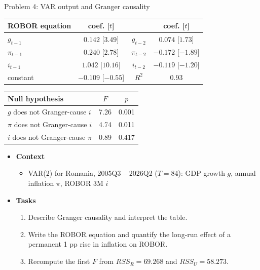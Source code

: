 \begin{frame}{Problem 4: VAR output and Granger causality}
\itemsize{\footnotesize}
\begin{center}
\scriptsize
\begin{tabular}{lccc}
\toprule
\textbf{ROBOR equation} & coef. [$t$] & & coef. [$t$] \\
\midrule
$g_{t-1}$ & $0.142$ [$3.49$] & $g_{t-2}$ & $0.074$ [$1.73$] \\
$\pi_{t-1}$ & $0.240$ [$2.78$] & $\pi_{t-2}$ & $\ensuremath{-}0.172$ [$\ensuremath{-}1.89$] \\
$i_{t-1}$ & $1.042$ [$10.16$] & $i_{t-2}$ & $\ensuremath{-}0.119$ [$\ensuremath{-}1.20$] \\
constant & $\ensuremath{-}0.109$ [$\ensuremath{-}0.55$] & $R^2$ & 0.93 \\
\bottomrule
\end{tabular}
\end{center}
\begin{center}
\scriptsize
\begin{tabular}{lcc}
\toprule
\textbf{Null hypothesis} & $F$ & $p$ \\
\midrule
$g$ does not Granger-cause $i$ & 7.26 & 0.001 \\
$\pi$ does not Granger-cause $i$ & 4.74 & 0.011 \\
$i$ does not Granger-cause $\pi$ & 0.89 & 0.417 \\
\bottomrule
\end{tabular}
\end{center}
\begin{itemize}
    \item \textbf{Context}
    \begin{itemize}
        \item VAR(2) for Romania, 2005Q3 -- 2026Q2 ($T = 84$): GDP growth $g$, annual inflation $\pi$, ROBOR 3M $i$
    \end{itemize}
    \item \textbf{Tasks}
\begin{enumerate}
    \item Describe Granger causality and interpret the table.
    \item Write the ROBOR equation and quantify the long-run effect of a permanent 1 pp rise in inflation on ROBOR.
    \item Recompute the first $F$ from $RSS_R = 69.268$ and $RSS_U = 58.273$.
\end{enumerate}
\end{itemize}
\end{frame}


